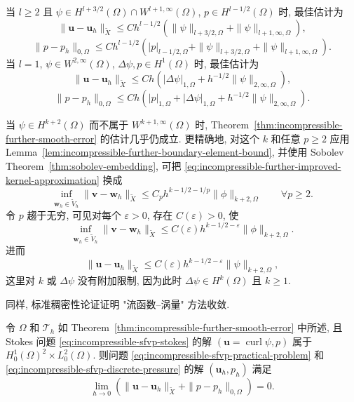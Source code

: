 当 $l\geq2$ 且
$\psi\in H^{l+3/2}(\Omega)\cap W^{l+1,\infty}(\Omega)$,
$p\in H^{l-1/2}(\Omega)$ 时, 最佳估计为
\[
\|\mathbf u-\mathbf u_h\|_{\widetilde X}
\leq Ch^{l-1/2}
\left(\|\psi\|_{l+3/2,\Omega}
+\|\psi\|_{l+1,\infty,\Omega}\right),
\]
\[
\|p-p_h\|_{0,\Omega}
\leq Ch^{l-1/2}
\left(|p|_{l-1/2,\Omega}
+\|\psi\|_{l+3/2,\Omega}
+\|\psi\|_{l+1,\infty,\Omega}\right).
\]
当 $l=1$, $\psi\in W^{2,\infty}(\Omega)$,
$\Delta\psi,p\in H^1(\Omega)$ 时, 最佳估计为
\[
\|\mathbf u-\mathbf u_h\|_{\widetilde X}
\leq Ch\left(|\Delta\psi|_{1,\Omega}
+h^{-1/2}\|\psi\|_{2,\infty,\Omega}\right),
\]
\[
\|p-p_h\|_{0,\Omega}
\leq Ch\left(|p|_{1,\Omega}+|\Delta\psi|_{1,\Omega}
+h^{-1/2}\|\psi\|_{2,\infty,\Omega}\right).
\]

\begin{Remark}\label{rem:incompressible-further-near-smooth-error}
当 $\psi\in H^{k+2}(\Omega)$ 而不属于
$W^{k+1,\infty}(\Omega)$ 时,
Theorem~\ref{thm:incompressible-further-smooth-error} 的估计几乎仍成立.
更精确地, 对这个 $k$ 和任意 $p\geq2$ 应用
Lemma~\ref{lem:incompressible-further-boundary-element-bound},
并使用 Sobolev Theorem~\ref{thm:sobolev-embedding},
可把 \eqref{eq:incompressible-further-improved-kernel-approximation} 换成
\[
\inf_{\mathbf w_h\in\widetilde V_h}
\|\mathbf v-\mathbf w_h\|_{\widetilde X}
\leq C_ph^{k-1/2-1/p}\|\phi\|_{k+2,\Omega}
\qquad\forall p\geq2.
\]
令 $p$ 趨于无穷, 可见对每个 $\varepsilon>0$,
存在 $C(\varepsilon)>0$, 使
\[
\inf_{\mathbf w_h\in\widetilde V_h}
\|\mathbf v-\mathbf w_h\|_{\widetilde X}
\leq C(\varepsilon)h^{k-1/2-\varepsilon}
\|\phi\|_{k+2,\Omega}.
\]
进而
\[
\|\mathbf u-\mathbf u_h\|_{\widetilde X}
\leq C(\varepsilon)h^{k-1/2-\varepsilon}
\|\psi\|_{k+2,\Omega},
\]
这里对 $k$ 或 $\Delta\psi$ 没有附加限制,
因为此时 $\Delta\psi\in H^k(\Omega)$ 且 $k\geq1$.
\end{Remark}

同样, 标准稠密性论证证明 "流函数--涡量" 方法收敛.

\begin{Corollary}\label{cor:incompressible-further-general-convergence}
令 $\Omega$ 和 $\mathcal T_h$ 如
Theorem~\ref{thm:incompressible-further-smooth-error} 中所述,
且 Stokes 问题 \eqref{eq:incompressible-sfvp-stokes}
的解 $(\mathbf u=\operatorname{curl}\psi,p)$
属于 $H_0^1(\Omega)^2\times L_0^2(\Omega)$.
则问题 \eqref{eq:incompressible-sfvp-practical-problem}
和 \eqref{eq:incompressible-sfvp-discrete-pressure} 的解
$(\mathbf u_h,p_h)$ 满足
\[
\lim_{h\to0}
\left(\|\mathbf u-\mathbf u_h\|_{\widetilde X}
+\|p-p_h\|_{0,\Omega}\right)=0.
\]
\end{Corollary}


